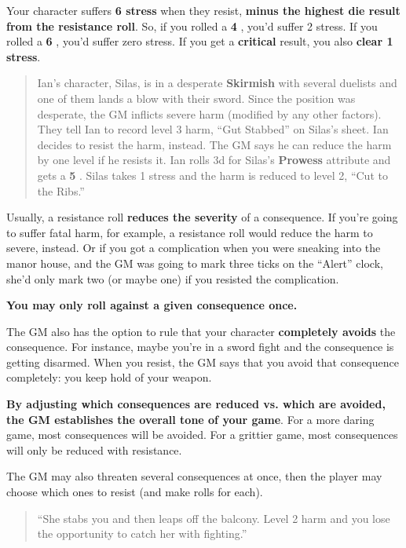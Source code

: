 \documentclass[11pt,fleqn,a5paper]{book}
\newcommand{\gameterm}[1]{\textbf{#1}}
\begin{document}
Your character suffers \textbf{6 stress} when they resist, \textbf{minus the highest die result from the resistance roll}. So, if you rolled a \gameterm{4} , you’d suffer 2 stress. If you rolled a \gameterm{6} , you’d suffer zero stress. If you get a \gameterm{critical}  result, you also \textbf{clear 1 stress}.

\begin{quote}
	Ian’s character, Silas, is in a desperate \gameterm{Skirmish}  with several duelists and one of them lands a blow with their sword. Since the position was desperate, the GM inflicts severe harm (modified by any other factors). They tell Ian to record level 3 harm, “Gut Stabbed” on Silas’s sheet. Ian decides to resist the harm, instead. The GM says he can reduce the harm by one level if he resists it. Ian rolls 3d for Silas’s \gameterm{Prowess}  attribute and gets a \gameterm{5} . Silas takes 1 stress and the harm is reduced to level 2, “Cut to the Ribs.”
\end{quote}

Usually, a resistance roll \textbf{reduces the severity} of a consequence. If you’re going to suffer fatal harm, for example, a resistance roll would reduce the harm to severe, instead. Or if you got a complication when you were sneaking into the manor house, and the GM was going to mark three ticks on the “Alert” clock, she’d only mark two (or maybe one) if you resisted the complication.

\textbf{You may only roll against a given consequence once.}

The GM also has the option to rule that your character \textbf{completely avoids} the consequence. For instance, maybe you’re in a sword fight and the consequence is getting disarmed. When you resist, the GM says that you avoid that consequence completely: you keep hold of your weapon.

\textbf{By adjusting which consequences are reduced vs. which are avoided, the GM establishes the overall tone of your game}. For a more daring game, most consequences will be avoided. For a grittier game, most consequences will only be reduced with resistance.

The GM may also threaten several consequences at once, then the player may choose which ones to resist (and make rolls for each).

\begin{quote}
	“She stabs you and then leaps off the balcony. Level 2 harm and you lose the opportunity to catch her with fighting.”
\end{quote}
\end{document}
